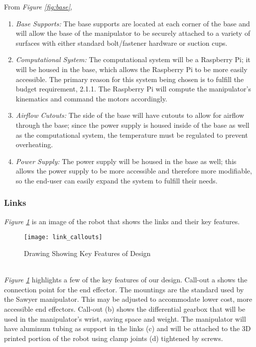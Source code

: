 From \emph{Figure \ref{fig:base}},
\begin{enumerate}[label=\alph*.]
  \item \emph{Base Supports:}
  The base supports are located at each corner of the base and will allow the base of the manipulator to be securely attached to a variety of surfaces with either standard bolt/fastener hardware or suction cups.
  \item \emph{Computational System:}
  The computational system will be a Raspberry Pi; it will be housed in the base, which allows the Raspberry Pi to be more easily accessible. The primary reason for this system being chosen is to fulfill the budget requirement, 2.1.1. The Raspberry Pi will compute the manipulator's kinematics and command the motors accordingly.
  \item \emph{Airflow Cutouts:}
  The side of the base will have cutouts to allow for airflow through the base; since the power supply is housed inside of the base as well as the computational system, the temperature must be regulated to prevent overheating.
  \item \emph{Power Supply:}
  The power supply will be housed in the base as well; this allows the power supply to be more accessible and therefore more modifiable, so the end-user can easily expand the system to fulfill their needs.
\end{enumerate}
\newpage
\subsubsection{Links}
\emph{Figure \ref{fig:link1}} is an image of the robot that shows the links and their key features.\\
\begin{figure}[htp]
  \centering
  \texttt{[image: link\_callouts]}
  \caption{Drawing Showing Key Features of Design}
  \label{fig:link1}
\end{figure} \\
\emph{Figure \ref{fig:link1}} highlights a few of the key features of our design. Call-out a shows the connection point for the end effector. The mountings are the standard used by the Sawyer manipulator. This may be adjusted to accommodate lower cost, more accessible end effectors. Call-out (b) shows the differential gearbox that will be used in the manipulator’s wrist, saving space and weight. The manipulator will have aluminum tubing as support in the links (c) and will be attached to the 3D printed portion of the robot using clamp joints (d) tightened by screws.

